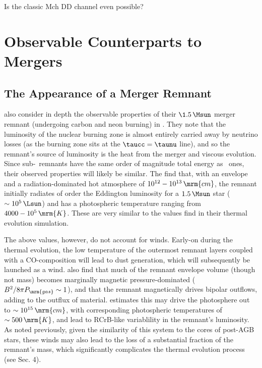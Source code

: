 
Is the classic Mch DD channel even possible?

\section{Observable Counterparts to Mergers}

\subsection{The Appearance of a Merger Remnant}

\cite{schw+16} also consider in depth the observable properties of their $\1.5\,\Msun$ merger remnant (undergoing carbon and neon burning) in \mesa.  They note that the luminosity of the nuclear burning zone is almost entirely carried away by neutrino losses (as the burning zone sits at the $\taucc = \taunu$ line), and so the remnant's source of luminosity is the heat from the merger and viscous evolution.  Since sub-\Mch\ remnants have the same order of magnitude total energy as \Mch\ ones, their observed properties will likely be similar.  The find that, with an envelope and a radiation-dominated hot atmosphere of $10^{12}-10^{13}\,\mrm{cm}$, the remnant initially radiates of order the Eddington luminosity for a $1.5\,\Msun$ star ($\sim10^5\,\Lsun$) and has a photospheric temperature ranging from $4000 - 10^5\,\mrm{K}$.  These are very similar to the values \cite{shen+12} find in their thermal evolution simulation.

The above values, however, do not account for winds.  Early-on during the thermal evolution, the low temperature of the outermost remnant layers coupled with a CO-composition will lead to dust generation, which will subsequently be launched as a wind.  \cite{ji+13} also find that much of the remnant envelope volume (though not mass) becomes marginally magnetic pressure-dominated ($B^2/8\pi P_\mrm{gas} \sim 1$), and that the remnant magnetically drives bipolar outflows, adding to the outflux of material.  \cite{schw+16} estimates this may drive the photosphere out to $\sim10^{15}\,\mrm{cm}$, with corresponding photospheric temperatures of $\sim500\,\mrm{K}$, and lead to RCrB-like variablility in the remnant's luminosity.  As noted previously, given the similarity of this system to the cores of post-AGB stars, these winds may also lead to the loss of a substantial fraction of the remnant's mass, which significantly complicates the thermal evolution process (see \cite{schw+16} Sec. 4).

